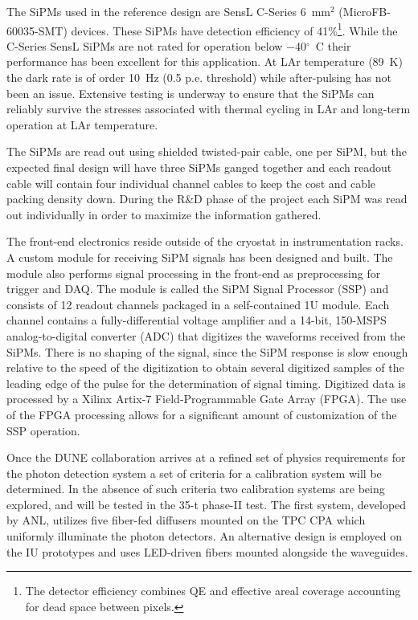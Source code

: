 The SiPMs used in the reference design are SensL C-Series 6~mm$^2$
(MicroFB-60035-SMT) devices. These SiPMs have detection efficiency of
41\%\footnote{The detector efficiency combines QE and effective areal
  coverage accounting for dead space between pixels.}. While the
C-Series SensL SiPMs are not rated for operation below
$-$40$^{\circ}$~C their performance has been excellent for this
application. At LAr temperature (89~K) the dark rate is of order 10~Hz
(0.5 p.e. threshold) while after-pulsing has not been an
issue. Extensive testing is underway to ensure that the SiPMs can
reliably survive the stresses associated with thermal cycling in LAr
and long-term operation at LAr temperature.

The SiPMs are read out using shielded twisted-pair cable, one per SiPM,
but the expected final design will have three SiPMs ganged together and
each readout cable will contain four individual channel cables to keep
the cost and cable packing density down. During the R\&D phase of the
project each SiPM was read out individually in order to maximize the information
gathered.  

The front-end electronics reside outside of the cryostat in
instrumentation racks. A custom module for receiving SiPM signals has
been designed and built. The module also performs signal processing in
the front-end as preprocessing for trigger and DAQ.  The module is
called the SiPM Signal Processor (SSP) and consists of 12 readout
channels packaged in a self-contained 1U module.  Each channel
contains a fully-differential voltage amplifier and a 14-bit, 150-MSPS
analog-to-digital converter (ADC) that digitizes the waveforms
received from the SiPMs. There is no shaping of the signal, since the
SiPM response is slow enough relative to the speed of the digitization
to obtain several digitized samples of the leading edge of the pulse
for the determination of signal timing. Digitized data is processed by
a Xilinx Artix-7 Field-Programmable Gate Array (FPGA).  The use of the
FPGA processing allows for a significant amount of customization of
the SSP operation. 

Once the DUNE collaboration arrives at a refined set of physics
requirements for the photon detection system a set of criteria for a
calibration system will be determined. In the absence of such criteria
two calibration systems are being explored, and will be tested in
the 35-t phase-II test. The first system, developed by ANL, utilizes five
fiber-fed diffusers mounted on the TPC CPA which uniformly illuminate
the photon detectors. An alternative design is employed on the IU
prototypes and uses LED-driven fibers mounted alongside the
waveguides. 

